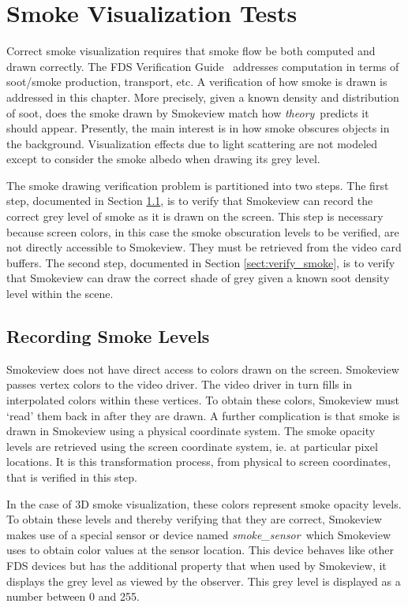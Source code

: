 \documentclass[11pt,twoside]{book}
\begin{document}
\chapter{Smoke Visualization Tests}

Correct smoke visualization requires that smoke flow be both computed and drawn correctly.
The FDS Verification Guide~\cite{FDS_Verification_Guide} addresses computation in terms of
soot/smoke production, transport, etc. A verification of how smoke is drawn is addressed in
this chapter. More precisely, given a known density and distribution of soot, does the smoke
drawn by Smokeview match how {\em theory}\ predicts it should appear.  Presently, the main
interest is in how smoke obscures objects in the background.  Visualization effects due to
light scattering are not modeled except to consider the smoke albedo when drawing its grey level.

The smoke drawing verification problem is partitioned into two steps. The first step,
documented in Section \ref{sect:record_smoke}, is to verify that Smokeview can record
the correct grey level of smoke as it is drawn on the screen. This step is necessary
because screen colors, in this case the smoke obscuration levels to be verified, are
not directly accessible to Smokeview. They must be retrieved from the video card
buffers. The second step, documented in Section \ref{sect:verify_smoke}, is to
verify that Smokeview can draw the correct shade of grey given a known soot density level
within the scene.
\section{Recording Smoke Levels}
\label{sect:record_smoke}

Smokeview does not have direct access to colors drawn on the screen.
Smokeview passes vertex colors to the video driver.
The video driver in turn fills in interpolated colors within these vertices.
To obtain these colors, Smokeview must `read' them back in after they are drawn.
A further complication is that smoke is drawn in Smokeview using a physical coordinate system.
The smoke opacity levels are retrieved using the screen coordinate system, ie.
at particular pixel locations.
It is this transformation process, from physical to screen coordinates,
that is verified in this step.

In the case of 3D smoke visualization, these colors represent smoke opacity levels.
To obtain these levels and thereby verifying that they are correct,
Smokeview makes use of a special sensor or device named {\em smoke\_sensor}\
which Smokeview uses to obtain color values at the sensor location.
This device behaves like other FDS devices but has the additional
property that when used by Smokeview, it displays the grey level as viewed by the observer.
This grey level is displayed as a number between 0 and 255.
\end{document}
